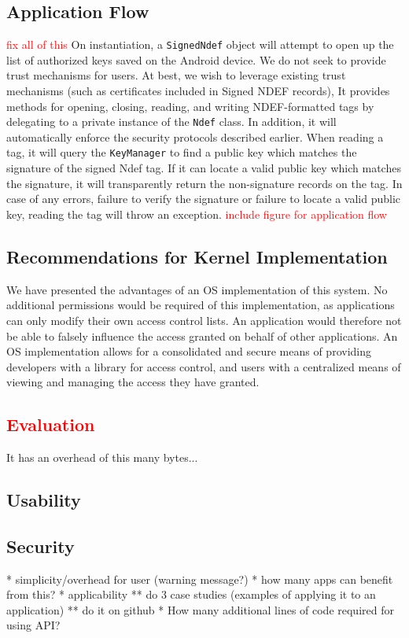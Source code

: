 \documentclass[12pt]{article}
\newcommand\TODO[1]{\textcolor{red}{#1}}
\newcommand\todo[1]{\textcolor{red}{#1}}
\begin{document}
\subsection{Application Flow}
\todo{fix all of this}
On instantiation, a \texttt{SignedNdef} object will attempt to open up the list of authorized keys saved on the Android device.
We do not seek to provide trust mechanisms for users.
At best, we wish to leverage existing trust mechanisms (such as certificates included in Signed NDEF records), 
It provides methods for opening, closing, reading, and writing NDEF-formatted tags by delegating to a private instance of the \texttt{Ndef} class.
In addition, it will automatically enforce the security protocols described earlier.
When reading a tag, it will query the \texttt{KeyManager} to find a public key which matches the signature of the signed Ndef tag.
If it can locate a valid public key which matches the signature, it will transparently return the non-signature records on the tag.
In case of any errors, failure to verify the signature or failure to locate a valid public key, reading the tag will throw an exception.
\TODO{include figure for application flow}

\subsection{Recommendations for Kernel Implementation}
We have presented the advantages of an OS implementation of this system.
No additional permissions would be required of this implementation, as applications can only modify their own access control lists.
An application would therefore not be able to falsely influence the access granted on behalf of other applications.
An OS implementation allows for a consolidated and secure means of providing developers with a library for access control, and users with a centralized means of viewing and managing the access they have granted.

\TODO{\section{Evaluation}}
It has an overhead of this many bytes... 
\subsection{Usability}
\subsection{Security}
* simplicity/overhead for user (warning message?)
* how many apps can benefit from this?
* applicability
** do 3 case studies (examples of applying it to an application)
** do it on github
* How many additional lines of code required for using API?
\end{document}
